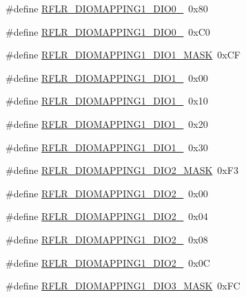 \begin{DoxyCompactItemize}
\item 
\#define \mbox{\hyperlink{sx1276_regs-_lo_ra_8h_a71222a82d6394750e0b5fc440617c447}{R\+F\+L\+R\+\_\+\+D\+I\+O\+M\+A\+P\+P\+I\+N\+G1\+\_\+\+D\+I\+O0\+\_}}~0x80
\item 
\#define \mbox{\hyperlink{sx1276_regs-_lo_ra_8h_a9e64a93bbe4b9e41debac37fae14fa98}{R\+F\+L\+R\+\_\+\+D\+I\+O\+M\+A\+P\+P\+I\+N\+G1\+\_\+\+D\+I\+O0\+\_}}~0x\+C0
\item 
\#define \mbox{\hyperlink{sx1276_regs-_lo_ra_8h_a393a84b91029e234b6d5ca1662d137ff}{R\+F\+L\+R\+\_\+\+D\+I\+O\+M\+A\+P\+P\+I\+N\+G1\+\_\+\+D\+I\+O1\+\_\+\+M\+A\+SK}}~0x\+CF
\item 
\#define \mbox{\hyperlink{sx1276_regs-_lo_ra_8h_a722ab613c1b99d008acb7d0b5e41a19d}{R\+F\+L\+R\+\_\+\+D\+I\+O\+M\+A\+P\+P\+I\+N\+G1\+\_\+\+D\+I\+O1\+\_}}~0x00
\item 
\#define \mbox{\hyperlink{sx1276_regs-_lo_ra_8h_a52490d96aa23316e4c2722adc0f27d25}{R\+F\+L\+R\+\_\+\+D\+I\+O\+M\+A\+P\+P\+I\+N\+G1\+\_\+\+D\+I\+O1\+\_}}~0x10
\item 
\#define \mbox{\hyperlink{sx1276_regs-_lo_ra_8h_abb77d9e03102bf5f40a5761b7670c5f3}{R\+F\+L\+R\+\_\+\+D\+I\+O\+M\+A\+P\+P\+I\+N\+G1\+\_\+\+D\+I\+O1\+\_}}~0x20
\item 
\#define \mbox{\hyperlink{sx1276_regs-_lo_ra_8h_aba98ad397693e9f3768bfa7ae5a3eb6f}{R\+F\+L\+R\+\_\+\+D\+I\+O\+M\+A\+P\+P\+I\+N\+G1\+\_\+\+D\+I\+O1\+\_}}~0x30
\item 
\#define \mbox{\hyperlink{sx1276_regs-_lo_ra_8h_ac0828a1effa434c36dd94a983d54375d}{R\+F\+L\+R\+\_\+\+D\+I\+O\+M\+A\+P\+P\+I\+N\+G1\+\_\+\+D\+I\+O2\+\_\+\+M\+A\+SK}}~0x\+F3
\item 
\#define \mbox{\hyperlink{sx1276_regs-_lo_ra_8h_a2f0f04b85bbb762368832a1b37ac7711}{R\+F\+L\+R\+\_\+\+D\+I\+O\+M\+A\+P\+P\+I\+N\+G1\+\_\+\+D\+I\+O2\+\_}}~0x00
\item 
\#define \mbox{\hyperlink{sx1276_regs-_lo_ra_8h_a3c67981c0926e7c1e8d0eb1aee9afdee}{R\+F\+L\+R\+\_\+\+D\+I\+O\+M\+A\+P\+P\+I\+N\+G1\+\_\+\+D\+I\+O2\+\_}}~0x04
\item 
\#define \mbox{\hyperlink{sx1276_regs-_lo_ra_8h_a9b1a690269c769c7a7eec3b20238868a}{R\+F\+L\+R\+\_\+\+D\+I\+O\+M\+A\+P\+P\+I\+N\+G1\+\_\+\+D\+I\+O2\+\_}}~0x08
\item 
\#define \mbox{\hyperlink{sx1276_regs-_lo_ra_8h_a2c4eeeb8117d63b3e7caf7c7d664aad0}{R\+F\+L\+R\+\_\+\+D\+I\+O\+M\+A\+P\+P\+I\+N\+G1\+\_\+\+D\+I\+O2\+\_}}~0x0C
\item 
\#define \mbox{\hyperlink{sx1276_regs-_lo_ra_8h_a671275ba8790f890b2cab8745c0e5da9}{R\+F\+L\+R\+\_\+\+D\+I\+O\+M\+A\+P\+P\+I\+N\+G1\+\_\+\+D\+I\+O3\+\_\+\+M\+A\+SK}}~0x\+FC

\end{DoxyCompactItemize}
